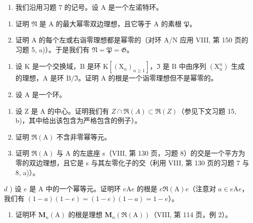 \begin{enumerate}
\def\labelenumi{\arabic{enumi})}
\setcounter{enumi}{7}
\tightlist
\item
  我们沿用习题 7 的记号。设 A 是一个左诺特环。
\end{enumerate}

\begin{enumerate}
\def\labelenumi{\alph{enumi})}
\item
  证明 \(\mathfrak{N}\) 是 A 的最大幂零双边理想，且它等于 A 的素根 \(\mathfrak{P}\)。
\item
  证明 A 的每个左或右诣零理想都是幂零的（对环 A/N 应用 VIII, 第 150 页的习题 5, a)）。于是我们有 \(\mathfrak{N} = \mathfrak{P} = \mathfrak{G}\)。
\end{enumerate}

\begin{enumerate}
\def\labelenumi{\arabic{enumi})}
\setcounter{enumi}{8}
\item
  设 \(\mathrm{K}\) 是一个交换域，\(\mathrm{B}\) 是环 \(\mathrm{K}[(\mathrm{X}_n)_{n\geqslant 1}]\)，\(\mathfrak{I}\) 是 \(\mathrm{B}\) 中由序列 \((\mathrm{X}_n^n)\) 生成的理想，\(\mathrm{A}\) 是环 \(\mathrm{B} / \mathfrak{I}\)。证明 \(\mathrm{A}\) 的根是一个诣零理想但不是幂零的。
\item
  设 A 是一个环。
\end{enumerate}

\begin{enumerate}
\def\labelenumi{\alph{enumi})}
\item
  设 Z 是 A 的中心。证明我们有 \(Z \cap \Re(A) \subset \Re(Z)\)（参见下文习题 15, b)，其中给出该包含为严格包含的例子）。
\item
  证明 \(\Re(\mathrm{A})\) 不含非零幂等元。
\item
  证明 \(\Re(\mathrm{A})\) 与 A 的左底座 s（VIII, 第 130 页，习题 8）的交是一个平方为零的双边理想，且它是 s 与其左零化子的交（利用 VIII, 第 130 页的习题 7 与 8, a)）。
\end{enumerate}

\(d\) ) 设 \(e\) 是 A 中的一个幂等元。证明环 \(e\mathrm{A}e\) 的根是 \(e\Re (\mathrm{A})e\)（注意对 \(a\in e\mathrm{A}e\)，我们有 \((1 - a)(1 - e) = (1 - e)(1 - a) = 1 - e\)）。

\begin{enumerate}
\def\labelenumi{\alph{enumi})}
\setcounter{enumi}{4}
\tightlist
\item
  证明环 \(\mathbf{M}_{n}(\mathrm{A})\) 的根是理想 \(\mathbf{M}_{n}(\Re(\mathrm{A}))\)（VIII, 第 114 页，例 2）。
\end{enumerate}

